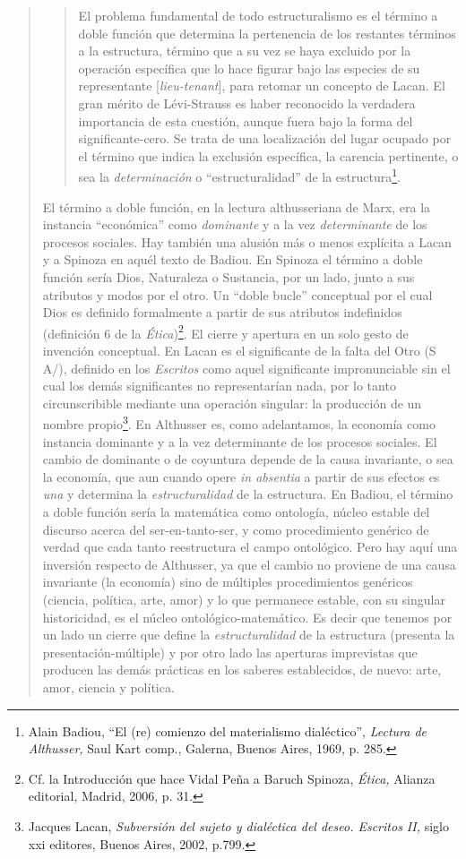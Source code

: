\begin{quote}
\begin{quote}
El problema fundamental de todo estructuralismo es el término a doble función que determina la pertenencia de los restantes términos a la estructura, término que a su vez se haya excluido por la operación específica que lo hace figurar bajo las especies de su representante {[}\emph{lieu-tenant}{]}, para retomar un concepto de Lacan. El gran mérito de Lévi-Strauss es haber reconocido la verdadera importancia de esta cuestión, aunque fuera bajo la forma del significante-cero. Se trata de una localización del lugar ocupado por el término que indica la exclusión específica, la carencia pertinente, o sea la \emph{determinación} o \enquote{estructuralidad} de la estructura\footnote{Alain Badiou, \enquote{El (re) comienzo del materialismo dialéctico}, \emph{Lectura de Althusser,} Saul Kart comp., Galerna, Buenos Aires, 1969, p. 285.}.
\end{quote}

El término a doble función, en la lectura althusseriana de Marx, era la instancia \enquote{económica} como \emph{dominante} y a la vez \emph{determinante} de los procesos sociales. Hay también una alusión más o menos explícita a Lacan y a Spinoza en aquél texto de Badiou. En Spinoza el término a doble función sería Dios, Naturaleza o Sustancia, por un lado, junto a sus atributos y modos por el otro. Un \enquote{doble bucle} conceptual por el cual Dios es definido formalmente a partir de sus atributos indefinidos (definición 6 de la \emph{Ética})\footnote{Cf. la Introducción que hace Vidal Peña a Baruch Spinoza, \emph{Ética,} Alianza editorial, Madrid, 2006, p. 31.}. El cierre y apertura en un solo gesto de invención conceptual. En Lacan es el significante de la falta del Otro (S A/), definido en los \emph{Escritos} como aquel significante impronunciable sin el cual los demás significantes no representarían nada, por lo tanto circunscribible mediante una operación singular: la producción de un nombre propio\footnote{Jacques Lacan, \emph{Subversión del sujeto y dialéctica del deseo. Escritos II,} siglo xxi editores, Buenos Aires, 2002, p.799.}. En Althusser es, como adelantamos, la economía como instancia dominante y a la vez determinante de los procesos sociales. El cambio de dominante o de coyuntura depende de la causa invariante, o sea la economía, que aun cuando opere \emph{in absentia} a partir de sus efectos es \emph{una} y determina la \emph{estructuralidad} de la estructura. En Badiou, el término a doble función sería la matemática como ontología, núcleo estable del discurso acerca del ser-en-tanto-ser, y como procedimiento genérico de verdad que cada tanto reestructura el campo ontológico. Pero hay aquí una inversión respecto de Althusser, ya que el cambio no proviene de una causa invariante (la economía) sino de múltiples procedimientos genéricos (ciencia, política, arte, amor) y lo que permanece estable, con su singular historicidad, es el núcleo ontológico-matemático. Es decir que tenemos por un lado un cierre que define la \emph{estructuralidad} de la estructura (presenta la presentación-múltiple) y por otro lado las aperturas imprevistas que producen las demás prácticas en los saberes establecidos, de nuevo: arte, amor, ciencia y política.


\end{quote}
